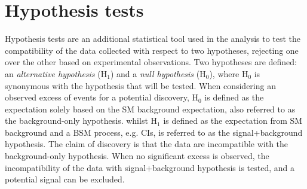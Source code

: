 \section{Hypothesis tests}\label{sec:stats:hypo}
Hypothesis tests are an additional statistical tool used in the analysis to test the compatibility of the data collected with respect to two hypotheses, rejecting one over the other based on experimental observations. Two hypotheses are defined: an \emph{alternative hypothesis} ($\mathrm{H_1}$) and a \emph{null hypothesis} ($\mathrm{H_0}$), where $\mathrm{H}_0$ is synonymous with the hypothesis that will be tested. When considering an observed excess of events for a potential discovery, $\mathrm{H_0}$ is defined as the expectation solely based on the SM background expectation, also referred to as the background-only hypothesis. whilst $\mathrm{H_1}$ is defined as the expectation from SM background and a BSM process, e.g. CIs, is referred to as the signal+background hypothesis. The claim of discovery is that the data are incompatible with the background-only hypothesis. When no significant excess is observed, the incompatibility of the data with signal+background hypothesis is tested, and a potential signal can be excluded. 

